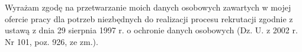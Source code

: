 \\\\Wyrażam zgodę na przetwarzanie moich danych osobowych zawartych w mojej ofercie pracy dla potrzeb niezbędnych do realizacji procesu rekrutacji zgodnie z ustawą z dnia 29 sierpnia 1997 r. o ochronie danych osobowych (Dz. U. z 2002 r. Nr 101, poz. 926, ze zm.).